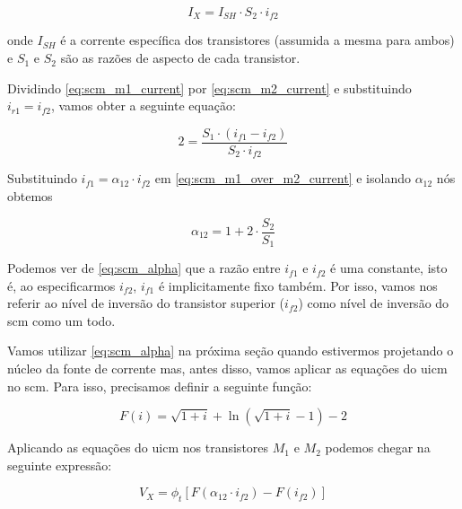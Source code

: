 \documentclass[10pt,a4paper]{extreport}
\newcommand{\?}{\stackrel{?}{=}}
\begin{document}
\begin{equation}
    \label{eq:scm_m2_current}
    I_X=I_{SH}\cdot S_2\cdot i_{f2}
\end{equation}

\noindent onde $I_{SH}$ é a corrente específica dos transistores (assumida a mesma para ambos) e $S_1$ e $S_2$ são as razões de aspecto de cada transistor.

Dividindo \eqref{eq:scm_m1_current} por \eqref{eq:scm_m2_current} e substituindo $i_{r1}=i_{f2}$, vamos obter a seguinte equação:

\begin{equation}
    \label{eq:scm_m1_over_m2_current}
    2=\frac{S_1\cdot\left(i_{f1}-i_{f2}\right)}{S_2\cdot i_{f2}}
\end{equation}

Substituindo $i_{f1}=\alpha_{12}\cdot i_{f2}$ em \eqref{eq:scm_m1_over_m2_current} e isolando $\alpha_{12}$ nós obtemos

\begin{equation}
    \label{eq:scm_alpha}
    \alpha_{12}=1+2\cdot\frac{S_2}{S_1}
\end{equation}

Podemos ver de \eqref{eq:scm_alpha} que a razão entre $i_{f1}$ e $i_{f2}$ é uma constante, isto é, ao especificarmos $i_{f2}$, $i_{f1}$ é implicitamente fixo também. Por isso, vamos nos referir ao nível de inversão do transistor superior ($i_{f2}$) como nível de inversão do \acrshort{scm} como um todo.

Vamos utilizar \eqref{eq:scm_alpha} na próxima seção quando estivermos projetando o núcleo da fonte de corrente mas, antes disso, vamos aplicar as equações do \acrfull{uicm} no \acrshort{scm}. Para isso, precisamos definir a seguinte função:

\begin{equation}
    \label{eq:uicm_function}
    F(i)=\sqrt{1+i}+\ln\left(\sqrt{1+i}-1\right)-2
\end{equation}


Aplicando as equações do \acrshort{uicm} nos transistores $M_1$ e $M_2$ podemos chegar na seguinte expressão:

\begin{equation}
    \label{eq:scm_uicm}
    V_X=\phi_t\left[F(\alpha_{12}\cdot i_{f2})-F(i_{f2})\right]
\end{equation}
\end{document}
